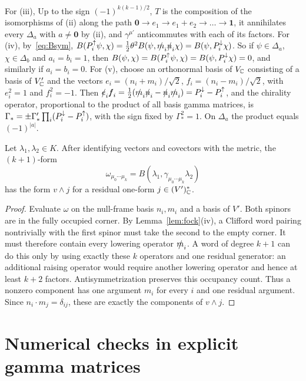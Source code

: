 For (iii), Up to the sign $(-1)^{k(k-1)/2}$, $T$ is the composition of the isomorphisms of (ii) along the path $\mathbf 0\to e_1\to e_1+e_2\to\dots\to\mathbf 1$, it annihilates every $\Delta_a$ with $a\ne\mathbf 0$ by (ii), and $\gamma^{\mu'}$ anticommutes with each of its factors. For (iv), by~\eqref{eq:Bsym}, $B(P^{\uparrow}_i\psi,\chi)=\frac12\theta^2B(\psi,\slashed{m}_i\slashed{n}_i\chi)=B(\psi,P^{\downarrow}_i\chi)$. So if $\psi\in\Delta_a$, $\chi\in\Delta_b$ and $a_i=b_i=1$, then $B(\psi,\chi)=B(P^{\uparrow}_i\psi,\chi)=B(\psi,P^{\downarrow}_i\chi)=0$, and similarly if $a_i=b_i=0$. For (v), choose an orthonormal basis of $V_{\mathbb{C}}$ consisting of a basis of $V'_{\mathbb{C}}$ and the vectors $e_i=(n_i+m_i)/\sqrt2$, $f_i=(n_i-m_i)/\sqrt2$, with $e_i^2=1$ and $f_i^2=-1$. Then $\slashed e_i\slashed f_i=\frac12(\slashed{m}_i\slashed{n}_i-\slashed{n}_i\slashed{m}_i)=P^{\downarrow}_i-P^{\uparrow}_i$, and the chirality operator, proportional to the product of all basis gamma matrices, is $\Gamma_*=\pm\Gamma'_*\prod_i(P^{\downarrow}_i-P^{\uparrow}_i)$, with the sign fixed by $\Gamma_*^2=1$. On $\Delta_a$ the product equals $(-1)^{|a|}$.

\begin{lemma}\label{lem:nullcurrent}
Let $\lambda_1,\lambda_2\in K$. After identifying vectors and covectors with the metric, the $(k+1)$-form
\[
 \omega_{\mu_0\cdots\mu_k}
   =B(\lambda_1,\gamma_{\mu_0\cdots\mu_k}\lambda_2)
\]
has the form $v\wedge j$ for a residual one-form $j\in(V')^*_{\mathbb{C}}$.
\end{lemma}
\begin{proof}
Evaluate $\omega$ on the null-frame basis $n_i,m_i$ and a basis of $V'$. Both spinors are in the fully occupied corner. By Lemma~\ref{lem:fock}(iv), a Clifford word pairing nontrivially with the first spinor must take the second to the empty corner. It must therefore contain every lowering operator $\slashed{m}_i$. A word of degree $k+1$ can do this only by using exactly these $k$ operators and one residual generator: an additional raising operator would require another lowering operator and hence at least $k+2$ factors. Antisymmetrization preserves this occupancy count. Thus a nonzero component has one argument $m_i$ for every $i$ and one residual argument. Since $n_i\cdot m_j=\delta_{ij}$, these are exactly the components of $v\wedge j$.
\end{proof}

\section{Numerical checks in explicit gamma matrices}
\label{app:checks}

